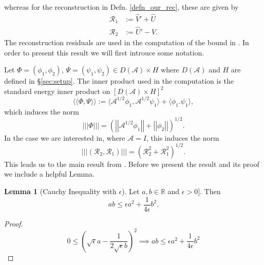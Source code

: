 \documentclass[12pt,a4paper]{article}
\numberwithin{equation}{section}
\theoremstyle{definition}
\newcommand{\pnorm}[1]{\left|\left|\left|#1\right|\right|\right|}
\newcommand{\qp}[1]{\left(#1\right)}
\newcommand{\qb}[1]{\left[#1\right]}
\newcommand{\Normgs}[1]{\left|\left|#1\right|\right|}
\newtheorem{Lemma}[subsection]{Lemma}
\begin{document}
whereas for the reconstruction in Defn. \ref{defn_our_rec}, these are given by
\begin{equation}\label{eq_residuals_our}
\begin{aligned}
\mathcal{R}_1&:=\hat{V}'+\hat{U}\\
\mathcal{R}_2&:=\hat{U}'-\hat{V}.
\end{aligned}
\end{equation}
The reconstruction residuals are used in the computation of the bound in \cite[Thm 3.1]{georgoulis2016posteriori}. In order to present this result we will first introuce some notation.

Let $\Phi=\qp{\phi_1, \phi_2}$, $\Psi =\qp{\psi_1,\psi_2}\in D\qp{\mathcal{A}}\times H$ where $D\qp{\mathcal{A}}$ and $H$ are defined in \S \ref{sec:setup}.  The inner product used in the computation is the standard energy inner product on $\qb{D\qp{\mathcal{A}}\times H}^2$
\begin{equation}\label{defn_innerprod}
\langle\langle \Phi,\Psi \rangle\rangle:= \langle \mathcal{A}^{1/2}\phi_1, \mathcal{A}^{1/2}\psi_1  \rangle + \langle \phi_1. \psi_1  \rangle,
\end{equation}
which induces the norm
\begin{equation}
\pnorm{\Phi} = \qp{\Normgs{\mathcal{A}^{1/2}\phi_1} + \Normgs{\phi_2}}^{1/2}.
\end{equation}
In the case we are interested in, where $\mathcal{A}=I$,  this induces the norm
\begin{equation}
\left|\left|\left|\left(\mathcal{R}_2, \mathcal{R}_1\right)\right|\right|\right| = (\mathcal{R}_2^2 +\mathcal{R}_1^2)^{1/2}.
\end{equation}
This leads us to the main result from \cite[Thm 3.1]{georgoulis2016posteriori}.  Before we present the result and its proof we include a helpful Lemma.
\begin{Lemma}[Cauchy Inequality with $\epsilon$]
	Let $a,b \in \mathbb{R}$ and $\epsilon>0]$.  Then
	\begin{equation}\label{eq_cauchy_ineq_eps}
	ab\leq \epsilon a^2 +\frac{1}{4\epsilon}b^2.
	\end{equation}
\end{Lemma}
\begin{proof}
	\begin{equation*}
	0\leq \qp{\sqrt{\epsilon}a-\frac{1}{2\sqrt{\epsilon}b}}^2\implies ab\leq \epsilon a^2 +\frac{1}{4\epsilon}b^2
	\end{equation*}
\end{proof}
\end{document}
